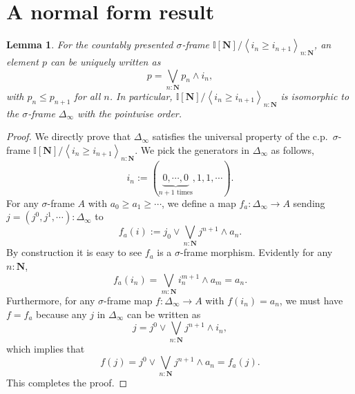 \documentclass[12pt]{amsart}
\newtheorem{lemma}[theorem]{Lemma}
\theoremstyle{definition}
\newcommand{\mb}[1]{\mathbf{#1}}
\newcommand{\mbb}[1]{\mathbb{#1}}
\newcommand{\I}{\mbb I}
\newcommand{\pair}[1]{\left\langle#1\right\rangle}
\newcommand{\N}{\mb N}
\begin{document}
\appendix

\section{A normal form result}

\begin{lemma}\label{app:normalsigma}
  For the countably presented $\sigma$-frame $\I[\N]/\pair{i_n \ge i_{n+1}}_{n:\N}$, an element $p$ can be uniquely written as 
  \[ p = \bigvee_{n:\N} p_n \wedge i_n, \]
  with $p_n \le p_{n+1}$ for all $n$. In particular, $\I[\N]/\pair{i_n \ge i_{n+1}}_{n:\N}$ is isomorphic to the $\sigma$-frame $\Delta_\infty$ with the pointwise order.
\end{lemma}
\begin{proof}
  We directly prove that $\Delta_\infty$ satisfies the universal property of the c.p.\ $\sigma$-frame $\I[\N]/\pair{i_n \ge i_{n+1}}_{n:\N}$. We pick the generators in $\Delta_\infty$ as follows,
  \[ i_n := (\underbrace{0,\cdots,0}_{n+1 \text{ times}},1,1,\cdots). \]
  For any $\sigma$-frame $A$ with $a_0 \ge a_1 \ge \cdots$, we define a map $f_a : \Delta_\infty \to A$ sending $j = (j^0,j^1,\cdots) : \Delta_\infty$ to
  \[ f_a(i) := j_0 \vee \bigvee_{n:\N} j^{n+1} \wedge a_{n}. \]
  By construction it is easy to see $f_a$ is a $\sigma$-frame morphism. Evidently for any $n : \N$, 
  \[ f_a(i_n) = \bigvee_{m:\N} i_n^{m+1} \wedge a_m = a_n. \]
  Furthermore, for any $\sigma$-frame map $f : \Delta_\infty \to A$ with $f(i_n) = a_n$, we must have $f = f_a$ because any $j$ in $\Delta_\infty$ can be written as
  \[ j = j^0 \vee \bigvee_{n:\N} j^{n+1} \wedge i_n, \]
  which implies that
  \[ f(j) = j^0 \vee \bigvee_{n:\N}j^{n+1} \wedge a_n = f_a(j). \]
  This completes the proof.
\end{proof}




\end{document}
